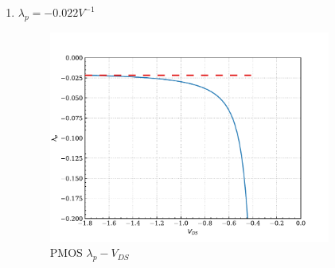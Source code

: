 \documentclass{article}
\begin{document}
\begin{enumerate}
\begin{enumerate}
\item \(\lambda_{p} = - 0.022 V^{-1}\)
\begin{figure}[H]
\centering
\includegraphics[width=350px]{img/q4/b/pmos-d-is-is.pdf}
\caption{\label{fig:nmos-d-is-is}PMOS \(\lambda_{p}-V_{DS}\)}
\end{figure}
\end{enumerate}
\end{enumerate}
\end{document}
